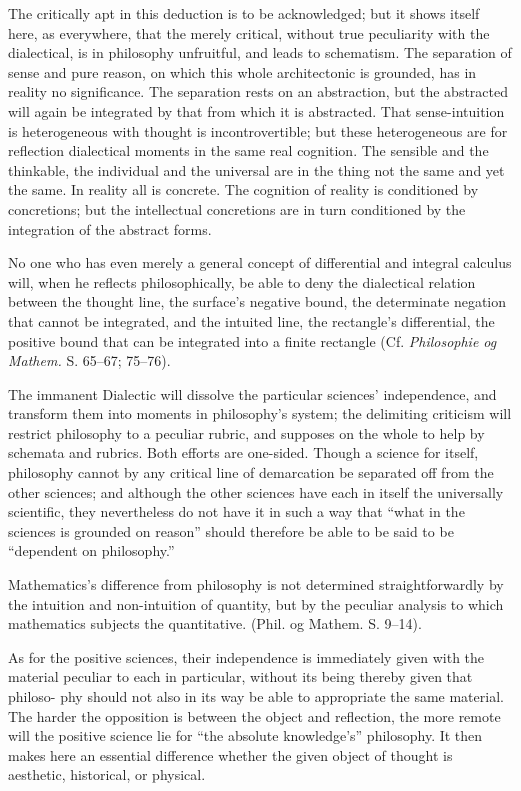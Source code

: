 \documentclass[12pt]{book}
\begin{document}
The critically apt in this deduction is to be acknowledged; but it shows itself here, as everywhere,
that the merely critical, without true peculiarity with the dialectical, is in philosophy unfruitful,
and leads to schematism. The separation of sense and pure reason, on which this whole architectonic
is grounded, has in reality no significance. The separation rests on an abstraction, but the
abstracted will again be integrated by that from which it is abstracted.
That sense-intuition is heterogeneous with thought is incontrovertible; but these heterogeneous are
for reflection dialectical moments in the same real cognition. The sensible and the thinkable, the
individual and the universal are in the thing not the same and yet the same. In reality all is
concrete. The cognition of reality is conditioned by concretions; but the intellectual concretions
are in turn conditioned by the integration of the abstract forms.

No one who has even merely a general concept of differential and integral calculus will, when he
reflects philosophically, be able to deny the dialectical relation between the thought line, the
surface's negative bound, the determinate negation that cannot be integrated, and the intuited line,
the rectangle's differential, the positive bound that can be integrated into a finite rectangle (Cf.
\emph{Philosophie og Mathem.} S. 65--67; 75--76).

The immanent Dialectic will dissolve the particular sciences' independence, and transform them into
moments in philosophy's system; the delimiting criticism will restrict philosophy to a peculiar
rubric, and supposes on the whole to help by schemata and rubrics. Both efforts are one-sided.
Though a science for itself, philosophy cannot by any critical line of demarcation be separated off
from the other sciences; and although the other sciences have each in itself the universally
scientific, they nevertheless do not have it in such a way that ``what in the sciences is grounded on
reason'' should therefore be able to be said to be ``dependent on philosophy.''

Mathematics's difference from philosophy is not determined straightforwardly by the intuition and
non-intuition of quantity, but by the peculiar analysis to which mathematics subjects the quantitative.
(Phil. og Mathem. S. 9--14).

As for the positive sciences, their independence is immediately given with the material peculiar to
each in particular, without its being thereby given that philoso-
phy should not also in its way be able to appropriate the same material. The harder the opposition is
between the object and reflection, the more remote will the positive science lie for ``the absolute
knowledge's'' philosophy. It then makes here an essential difference whether the given object of
thought is aesthetic, historical, or physical.
\end{document}
